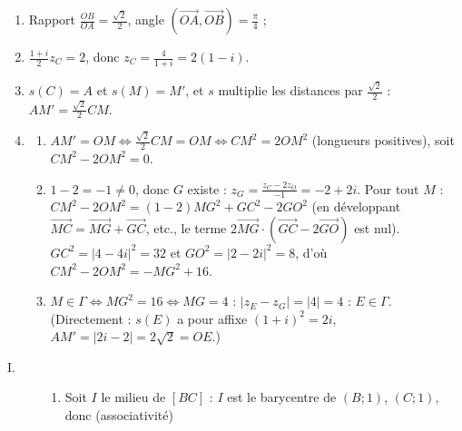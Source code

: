 \begin{corrige}
\begin{sol}
\begin{description}
\end{description}
\end{sol}
\begin{sol}
\begin{enumerate}
      \item Rapport $\frac{OB}{OA} = \frac{\sqrt2}{2}$, angle $(\overrightarrow{OA},\overrightarrow{OB}) = \frac{\pi}{4}$ ;
      \item $\frac{1+i}{2}z_C = 2$, donc $z_C = \frac{4}{1+i} = 2(1 - i)$. 
      \item $s(C) = A$ et $s(M) = M'$, et $s$ multiplie les distances par $\frac{\sqrt2}{2}$ : $AM' = \frac{\sqrt2}{2}CM$.
      \item \begin{enumerate}
                  \item $AM' = OM \iff \frac{\sqrt2}{2}CM = OM \iff CM^2 = 2OM^2$ (longueurs positives), soit $CM^2 - 2OM^2 = 0$.
                  \item $1 - 2 = -1 \neq 0$, donc $G$ existe : $z_G = \frac{z_C - 2z_O}{-1} = -2 + 2i$.
                        Pour tout $M$ : $CM^2 - 2OM^2 = (1 - 2)MG^2 + GC^2 - 2GO^2$ (en développant $\overrightarrow{MC} = \overrightarrow{MG} + \overrightarrow{GC}$, etc.,
                        le terme $2\overrightarrow{MG}\cdot(\overrightarrow{GC} - 2\overrightarrow{GO})$ est nul).
                        $GC^2 = |4 - 4i|^2 = 32$ et $GO^2 = |2 - 2i|^2 = 8$, d'où $CM^2 - 2OM^2 = -MG^2 + 16$.
                  \item $M \in \Gamma \iff MG^2 = 16 \iff MG = 4$ : 
                        $|z_E - z_G| = |4| = 4$ : $E \in \Gamma$. (Directement : $s(E)$ a pour affixe $(1+i)^2 = 2i$, $AM' = |2i - 2| = 2\sqrt2 = OE$.)
            \end{enumerate}
\end{enumerate}
\end{sol}
\begin{sol}
\begin{description}
      \item[I.]
      \begin{enumerate}
            \item Soit $I$ le milieu de $[BC]$ : $I$ est le barycentre de $(B;1)$, $(C;1)$, donc (associativité)

\end{enumerate}
\end{description}
\end{sol}
\end{corrige}
